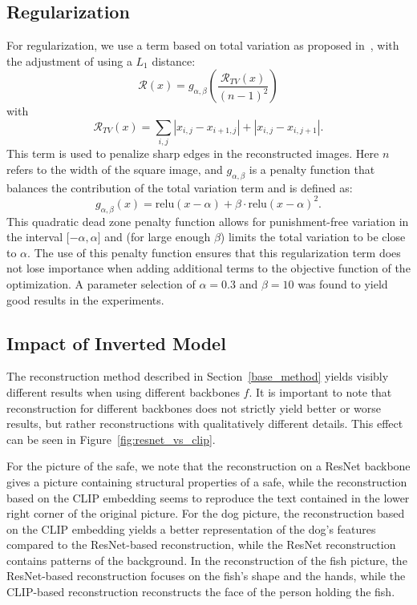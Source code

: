 \documentclass[10pt,twocolumn]{article}
\begin{document}
\subsection{Regularization}\label{reg}
For regularization, we use a term based on total variation as proposed in~\cite{mahendranUnderstandingDeepImage2015}, with the adjustment of using a $L_1$ distance:
\begin{equation}
\mathcal{R}(x) = g_{\alpha,\beta}\left(\dfrac{\mathcal{R}_{TV}(x)}{(n-1)^2}\right)
\end{equation}
with
\begin{equation}
\mathcal{R}_{TV}(x) = \sum_{i,j} \left| x_{i,j} - x_{i + 1,j} \right| + \left| x_{i,j} - x_{i,j + 1} \right|.
\end{equation}
This term is used to penalize sharp edges in the reconstructed images.
Here $n$ refers to the width of the square image, and $g_{\alpha,\beta}$ is a penalty function that balances the contribution of the total variation term and is defined as:
\begin{equation}
g_{\alpha,\beta}(x) = \text{relu}(x - \alpha) + \beta\cdot\text{relu}(x - \alpha) ^ 2.
\end{equation}
This quadratic dead zone penalty function allows for punishment-free variation in the interval $\lbrack-\alpha,\alpha\rbrack$ and (for large enough $\beta$) limits the total variation to be close to $\alpha$.
The use of this penalty function ensures that this regularization term does not lose importance when adding additional terms to the objective function of the optimization.
A parameter selection of $\alpha = 0.3$ and $\beta = 10$ was found to yield good results in the experiments.

\subsection{Impact of Inverted Model}
The reconstruction method described in Section~\ref{base_method} yields visibly different results when using different backbones $f$.
It is important to note that reconstruction for different backbones does not strictly yield better or worse results, but rather reconstructions with qualitatively different details.
This effect can be seen in Figure~\ref{fig:resnet_vs_clip}.

For the picture of the safe, we note that the reconstruction on a ResNet backbone gives a picture containing structural properties of a safe, while the reconstruction based on the CLIP embedding seems to reproduce the text contained in the lower right corner of the original picture.
For the dog picture, the reconstruction based on the CLIP embedding yields a better representation of the dog's features compared to the ResNet-based reconstruction, while the ResNet reconstruction contains patterns of the background.
In the reconstruction of the fish picture, the ResNet-based reconstruction focuses on the fish's shape and the hands, while the CLIP-based reconstruction reconstructs the face of the person holding the fish.
\end{document}
